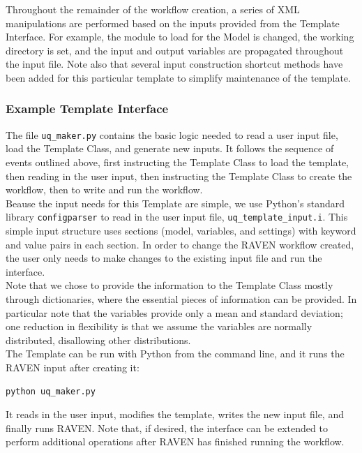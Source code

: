 Throughout the remainder of the workflow creation, a series of XML manipulations are performed based on the inputs provided from the Template Interface. For example, the module to load for the Model is changed, the working directory is set, and the input and output variables are propagated throughout the input file. Note also that several input construction shortcut methods have been added for this particular template to simplify maintenance of the template.


\subsubsection{Example Template Interface}
The file \texttt{uq\_maker.py} contains the basic logic needed to read a user input file, load the Template Class, and generate new inputs. It follows the sequence of events outlined above, first instructing the Template Class to load the template, then reading in the user input, then instructing the Template Class to create the workflow, then to write and run the workflow.
\\

Beause the input needs for this Template are simple, we use Python's standard library \texttt{configparser} to read in the user input file, \texttt{uq\_template\_input.i}. This simple input structure uses sections (model, variables, and settings) with keyword and value pairs in each section. In order to change the RAVEN workflow created, the user only needs to make changes to the existing input file and run the interface.
\\

Note that we chose to provide the information to the Template Class mostly through dictionaries, where the essential pieces of information can be provided. In particular note that the variables provide only a mean and standard deviation; one reduction in flexibility is that we assume the variables are normally distributed, disallowing other distributions.
\\

The Template can be run with Python from the command line, and it runs the RAVEN input after creating it:
\begin{lstlisting}[language=bash]
 python uq_maker.py
\end{lstlisting}
It reads in the user input, modifies the template, writes the new input file, and finally runs RAVEN. Note that, if desired, the interface can be extended to perform additional operations after RAVEN has finished running the workflow.
